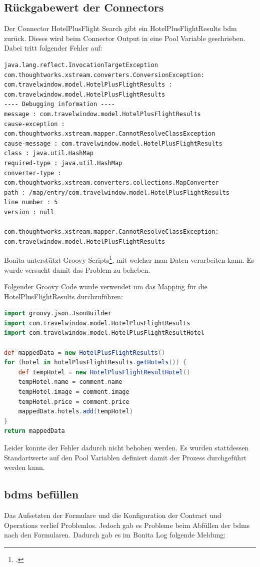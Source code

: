 \subsection{Rückgabewert der Connectors}
Der Connector HotelPlusFlight Search gibt ein HotelPlusFlightResults \gls{bdm} zurück. Dieses wird beim Connector Output in eine Pool Variable geschrieben. Dabei tritt folgender Fehler auf:
\begin{lstlisting}
java.lang.reflect.InvocationTargetException
com.thoughtworks.xstream.converters.ConversionException: com.travelwindow.model.HotelPlusFlightResults : com.travelwindow.model.HotelPlusFlightResults
---- Debugging information ----
message : com.travelwindow.model.HotelPlusFlightResults
cause-exception : com.thoughtworks.xstream.mapper.CannotResolveClassException
cause-message : com.travelwindow.model.HotelPlusFlightResults
class : java.util.HashMap
required-type : java.util.HashMap
converter-type : com.thoughtworks.xstream.converters.collections.MapConverter
path : /map/entry/com.travelwindow.model.HotelPlusFlightResults
line number : 5
version : null

com.thoughtworks.xstream.mapper.CannotResolveClassException: com.travelwindow.model.HotelPlusFlightResults
\end{lstlisting}
Bonita unterstützt Groovy Scripts\footcite{Groovy_2016-06-25}, mit welcher man Daten verarbeiten kann. Es wurde versucht damit das Problem zu beheben.

Folgender Groovy Code wurde verwendet um das Mapping für die HotelPlusFlightResults durchzuführen:
\begin{lstlisting}[language=Groovy,firstnumber=1]
import groovy.json.JsonBuilder
import com.travelwindow.model.HotelPlusFlightResults
import com.travelwindow.model.HotelPlusFlightResultHotel

def mappedData = new HotelPlusFlightResults()
for (hotel in hotelPlusFlightResults.getHotels()) {
	def tempHotel = new HotelPlusFlightResultHotel()
	tempHotel.name = comment.name
	tempHotel.image = comment.image
	tempHotel.price = comment.price
	mappedData.hotels.add(tempHotel)
}
return mappedData
\end{lstlisting}
Leider konnte der Fehler dadurch nicht behoben werden. Es wurden stattdessen Standartwerte auf den Pool Variablen definiert damit der Prozess durchgeführt werden kann.

\subsection{\glspl{bdm} befüllen}
Das Aufsetzten der Formulare und die Konfiguration der Contract und Operations verlief Problemlos. Jedoch gab es Probleme beim Abfüllen der \glspl{bdm} nach den Formularen. Dadurch gab es im Bonita Log folgende Meldung:

